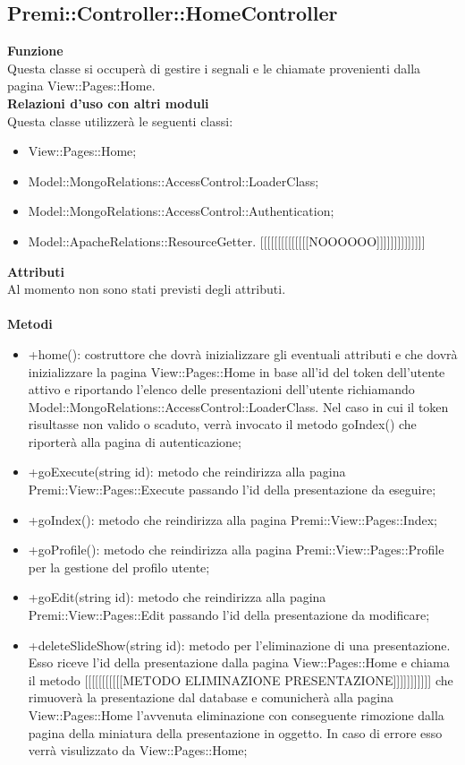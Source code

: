 {			\subsection{Premi::Controller::HomeController}{
					\label{sub:homecontroller}
					\textbf{Funzione}\\
					\indent Questa classe si occuperà di gestire i segnali e le chiamate provenienti dalla pagina View::Pages::Home.\\
					\textbf{Relazioni d'uso con altri moduli}\\
					\indent Questa classe utilizzerà le seguenti classi:
					\begin{itemize}
						\item View::Pages::Home;
						\item Model::MongoRelations::AccessControl::LoaderClass;
						\item Model::MongoRelations::AccessControl::Authentication;
						\item Model::ApacheRelations::ResourceGetter. [[[[[[[[[[[[[[NOOOOOO]]]]]]]]]]]]]]
					\end{itemize}
					\textbf{Attributi}\\
					\indent Al momento non sono stati previsti degli attributi.\\\\
					\textbf{Metodi}
					\begin{itemize}
						\item +home(): costruttore che dovrà inizializzare gli eventuali attributi e che dovrà inizializzare la pagina View::Pages::Home in base all'id del token dell'utente attivo e riportando l'elenco delle presentazioni dell'utente richiamando Model::MongoRelations::AccessControl::LoaderClass. Nel caso in cui il token risultasse non valido o scaduto, verrà invocato il metodo goIndex() che riporterà alla pagina di autenticazione;
						\item +goExecute(string id): metodo che reindirizza alla pagina Premi::View::Pages::Execute passando l'id della presentazione da eseguire;
						\item +goIndex(): metodo che reindirizza alla pagina Premi::View::Pages::Index;
						\item +goProfile(): metodo che reindirizza alla pagina Premi::View::Pages::Profile per la gestione del profilo utente;
						\item +goEdit(string id): metodo che reindirizza alla pagina Premi::View::Pages::Edit passando l'id della presentazione da modificare;
						\item +deleteSlideShow(string id): metodo per l'eliminazione di una presentazione. Esso riceve l'id della presentazione dalla pagina View::Pages::Home e chiama il metodo [[[[[[[[[[[METODO ELIMINAZIONE PRESENTAZIONE]]]]]]]]]]] che rimuoverà la presentazione dal database e comunicherà alla pagina View::Pages::Home l'avvenuta eliminazione con conseguente rimozione dalla pagina della miniatura della presentazione in oggetto. In caso di errore esso verrà visulizzato da View::Pages::Home; 

\end{itemize}}}
